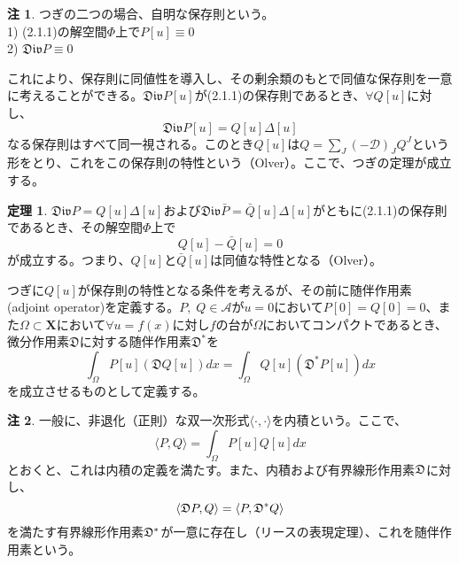 \documentclass[a4paper, 11pt]{report}
\theoremstyle{definition}
\newtheorem{theorem}{定理}[section]
\newtheorem*{remark*}{注}
\begin{document}
\begin{remark*}
 つぎの二つの場合、自明な保存則という。\\
1) (2.1.1)の解空間$\Phi$上で$P[u]\equiv 0$ \\
2) $\mathfrak{Div}P \equiv 0$
\end{remark*}

 これにより、保存則に同値性を導入し、その剰余類のもとで同値な保存則を一意に考えることができる。$\mathfrak{Div}P[u]$が(2.1.1)の保存則であるとき、$\forall Q[u]$に対し、
\begin{equation}
\mathfrak{Div}P[u] = Q[u]\varDelta[u] %
\end{equation}
なる保存則はすべて同一視される。このとき$Q[u]$は$Q=\sum_J(-\mathcal{D})_JQ^J$という形をとり、これをこの保存則の特性という（Olver\cite[Chap.4]{Olver4}）。ここで、つぎの定理が成立する。

\begin{theorem}
 $\mathfrak{Div}P = Q[u]\varDelta[u]$および$\mathfrak{Div}\bar{P} = \bar{Q}[u]\varDelta[u]$がともに(2.1.1)の保存則であるとき、その解空間$\Phi$上で
\begin{equation*}
Q[u] - \bar{Q}[u] = 0
\end{equation*}
が成立する。つまり、$Q[u]$と$\bar{Q}[u]$は同値な特性となる（Olver\cite[Chap.4]{Olver4}）。
\end{theorem}

 つぎに$Q[u]$が保存則の特性となる条件を考えるが、その前に随伴作用素(adjoint operator)を定義する。$P,\; Q\in \mathcal{A}$が$u=0$において$P[0]=Q[0]=0$、また$\Omega\subset \mathbf{X}$において$\forall u=f(x)$に対し$f$の台が$\Omega$においてコンパクトであるとき、微分作用素$\mathfrak{D}$に対する随伴作用素$\mathfrak{D}^*$を
\begin{equation*}
\int _\Omega P[u](\mathfrak{D}Q[u])dx = \int _\Omega Q[u](\mathfrak{D}^*P[u])dx
\end{equation*}
を成立させるものとして定義する。

\begin{remark*}
 一般に、非退化（正則）な双一次形式$\langle\cdot ,\cdot\rangle$を内積という。ここで、
\begin{equation*}
\langle P, Q\rangle = \int_\Omega P[u]Q[u] dx
\end{equation*}
とおくと、これは内積の定義を満たす。また、内積および有界線形作用素$\frak{D}$に対し、
\begin{equation*}
\langle \frak{D}P, Q\rangle = \langle P, \frak{D}^* Q\rangle
\end{equation*}
を満たす有界線形作用素$\frak{D}^*$が一意に存在し（リースの表現定理）、これを随伴作用素という。
\end{remark*}
\end{document}
